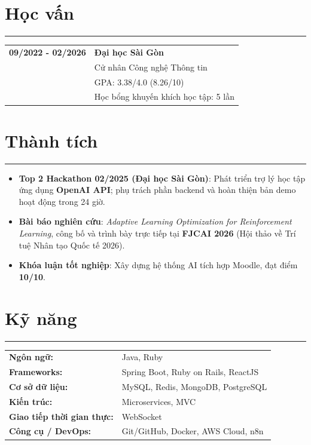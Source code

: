 \documentclass[a4paper,10pt]{article}
\renewcommand{\arraystretch}{1.2}
\begin{document}
\section{Học vấn}
\vspace{-10pt}
\noindent\rule{\linewidth}{0.5pt}
\begin{tabularx}{\linewidth}{l X}
    \textbf{09/2022 - 02/2026} & \textbf{Đại học Sài Gòn} \\
    & Cử nhân Công nghệ Thông tin \\
    & GPA: 3.38/4.0 (8.26/10) \\
    & Học bổng khuyến khích học tập: 5 lần
\end{tabularx}

\section{Thành tích}
\vspace{-8pt}
\noindent\rule{\linewidth}{0.5pt}
\begin{itemize}
    \item \textbf{Top 2 Hackathon 02/2025 (Đại học Sài Gòn)}: Phát triển trợ lý học tập ứng dụng \textbf{OpenAI API}; phụ trách phần backend và hoàn thiện bản demo hoạt động trong 24 giờ.
    \item \textbf{Bài báo nghiên cứu}: \textit{Adaptive Learning Optimization for Reinforcement Learning}, công bố và trình bày trực tiếp tại \textbf{FJCAI 2026} (Hội thảo về Trí tuệ Nhân tạo Quốc tế 2026).
    \item \textbf{Khóa luận tốt nghiệp}: Xây dựng hệ thống AI tích hợp Moodle, đạt điểm \textbf{10/10}.
\end{itemize}

\section{Kỹ năng}
\vspace{-10pt}
\noindent\rule{\linewidth}{0.5pt}
\renewcommand{\arraystretch}{1.1}
\begin{tabularx}{\linewidth}{l X}
    \textbf{Ngôn ngữ:} & Java, Ruby \\
    \textbf{Frameworks:} & Spring Boot, Ruby on Rails, ReactJS \\
    \textbf{Cơ sở dữ liệu:} & MySQL, Redis, MongoDB, PostgreSQL \\
    \textbf{Kiến trúc:} & Microservices, MVC \\
    \textbf{Giao tiếp thời gian thực:} & WebSocket \\
    \textbf{Công cụ / DevOps:} & Git/GitHub, Docker, AWS Cloud, n8n
\end{tabularx}
\end{document}
